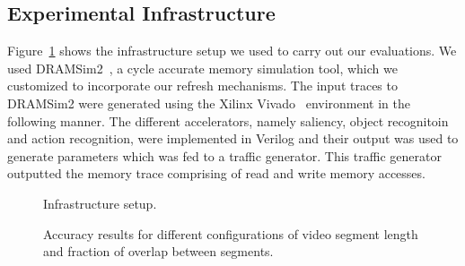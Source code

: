 \subsection{Experimental Infrastructure}
Figure~\ref{fig:experimental-setup} shows the infrastructure setup we used to carry out our evaluations.
We used DRAMSim2~\cite{DRAMsim2}, a cycle accurate memory simulation tool, which we customized to incorporate our refresh mechanisms. 
The input traces to DRAMSim2 were generated using the Xilinx Vivado~\cite{vivado} environment in the following manner.
The different accelerators, namely saliency, object recognitoin and action recognition, were implemented in Verilog and their output was used to generate parameters which was fed to a traffic generator.
This traffic generator outputted the memory trace comprising of read and write memory accesses.

\begin{figure}[ht!]
\centering
{}
\caption{\label{fig:experimental-setup} Infrastructure setup.}
\end{figure}


\begin{figure}[ht!]
\centering
{}
\caption{\label{fig:ActionRecogntion} Accuracy results for different configurations of video segment length and fraction of overlap between segments.}
\end{figure}
